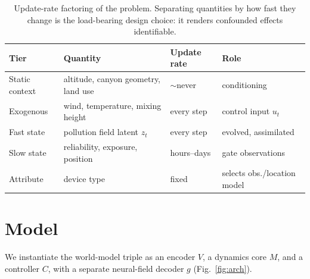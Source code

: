 \documentclass[10pt]{article}
\begin{document}
\begin{table}[t]
\centering
\small
\begin{tabular}{@{}llll@{}}
\toprule
\textbf{Tier} & \textbf{Quantity} & \textbf{Update rate} & \textbf{Role} \\
\midrule
Static context & altitude, canyon geometry, land use & $\sim$never & conditioning \\
Exogenous & wind, temperature, mixing height & every step & control input $u_t$ \\
Fast state & pollution field latent $z_t$ & every step & evolved, assimilated \\
Slow state & reliability, exposure, position & hours--days & gate observations \\
Attribute & device type & fixed & selects obs./location model \\
\bottomrule
\end{tabular}
\caption{Update-rate factoring of the problem. Separating quantities by how fast
they change is the load-bearing design choice: it renders confounded effects
identifiable.}
\label{tab:tiers}
\end{table}

\section{Model}
\label{sec:model}
We instantiate the world-model triple as an encoder $V$, a dynamics core $M$, and
a controller $C$, with a separate neural-field decoder $g$ (Fig.~\ref{fig:arch}).
\end{document}
